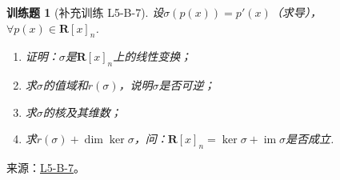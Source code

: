 \documentclass[UTF8,12pt,a4paper,fontset=fandol]{ctexart}
\newtheorem{exercise}{训练题}[section]
\begin{document}
\begin{exercise}[补充训练 L5-B-7]\label{prob:L5-B-7}
设$\sigma(p(x))=p'(x)$（求导），$\forall p(x) \in \mathbf{R}[x]_n$.
        \begin{enumerate}
            \item 证明：$\sigma$是$\mathbf{R}[x]_n$上的线性变换；

            \item 求$\sigma$的值域和$r(\sigma)$，说明$\sigma$是否可逆；

            \item 求$\sigma$的核及其维数；

            \item 求$r(\sigma)+\dim\ker\sigma$，问：$\mathbf{R}[x]_n=\ker\sigma+\operatorname{im} \sigma$是否成立.
        \end{enumerate}
\end{exercise}
\noindent 来源：\href{https://github.com/yhwu-is/Linear-Algebra-Left-Undone/blob/new/%E8%AE%B2%E4%B9%89/%E4%B8%93%E9%A2%98/5%20%E7%BA%BF%E6%80%A7%E6%98%A0%E5%B0%84.tex}{L5-B-7}。
\end{document}
